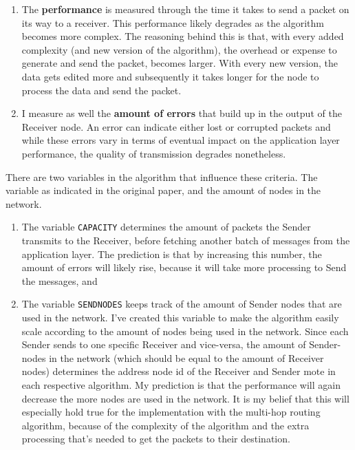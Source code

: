 \begin{enumerate}
\def\labelenumi{\arabic{enumi}.}
\itemsep1pt\parskip0pt
\item
  The \textbf{performance} is measured through the time it takes to send
  a packet on its way to a receiver. This performance likely degrades as
  the algorithm becomes more complex. The reasoning behind this is that,
  with every added complexity (and new version of the algorithm), the
  overhead or expense to generate and send the packet, becomes larger.
  With every new version, the data gets edited more and subsequently it
  takes longer for the node to process the data and send the packet.
\item
  I measure as well the \textbf{amount of errors} that build up in the
  output of the Receiver node. An error can indicate either lost or
  corrupted packets and while these errors vary in terms of eventual
  impact on the application layer performance, the quality of
  transmission degrades nonetheless.
\end{enumerate}

There are two variables in the algorithm that influence these criteria.
The variable \emph{} as indicated in the original paper, and the amount
of nodes in the network.

\begin{enumerate}
\def\labelenumi{\arabic{enumi}.}
\itemsep1pt\parskip0pt
\item
  The variable \texttt{CAPACITY} determines the amount of packets the
  Sender transmits to the Receiver, before fetching another batch of
  messages from the application layer. The prediction is that by
  increasing this number, the amount of errors will likely rise, because
  it will take more processing to Send the messages, and
\item
  The variable \texttt{SENDNODES} keeps track of the amount of Sender
  nodes that are used in the network. I've created this variable to make
  the algorithm easily scale according to the amount of nodes being used
  in the network. Since each Sender sends to one specific Receiver and
  vice-versa, the amount of Sender-nodes in the network (which should be
  equal to the amount of Receiver nodes) determines the address node id
  of the Receiver and Sender mote in each respective algorithm. My
  prediction is that the performance will again decrease the more nodes
  are used in the network. It is my belief that this will especially
  hold true for the implementation with the multi-hop routing algorithm,
  because of the complexity of the algorithm and the extra processing
  that's needed to get the packets to their destination.
\end{enumerate}

